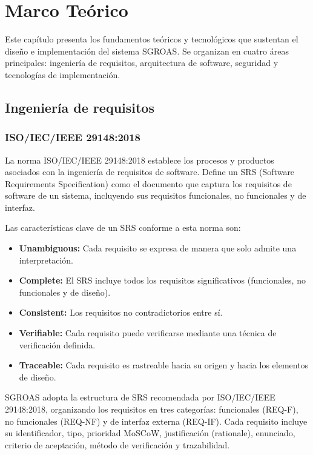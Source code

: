 \chapter{Marco Teórico}
\label{cap:marco-teorico}

Este capítulo presenta los fundamentos teóricos y tecnológicos que sustentan el diseño e implementación del sistema SGROAS. Se organizan en cuatro áreas principales: ingeniería de requisitos, arquitectura de software, seguridad y tecnologías de implementación.

\section{Ingeniería de requisitos}
\label{sec:req-theory}

\subsection{ISO/IEC/IEEE 29148:2018}
\label{sec:iso29148}

La norma ISO/IEC/IEEE 29148:2018 \cite{iso29148} establece los procesos y productos asociados con la ingeniería de requisitos de software. Define un SRS (Software Requirements Specification) como el documento que captura los requisitos de software de un sistema, incluyendo sus requisitos funcionales, no funcionales y de interfaz.

Las características clave de un SRS conforme a esta norma son:
\begin{itemize}
  \item \textbf{Unambiguous:} Cada requisito se expresa de manera que solo admite una interpretación.
  \item \textbf{Complete:} El SRS incluye todos los requisitos significativos (funcionales, no funcionales y de diseño).
  \item \textbf{Consistent:} Los requisitos no contradictorios entre sí.
  \item \textbf{Verifiable:} Cada requisito puede verificarse mediante una técnica de verificación definida.
  \item \textbf{Traceable:} Cada requisito es rastreable hacia su origen y hacia los elementos de diseño.
\end{itemize}

SGROAS adopta la estructura de SRS recomendada por ISO/IEC/IEEE 29148:2018, organizando los requisitos en tres categorías: funcionales (REQ-F), no funcionales (REQ-NF) y de interfaz externa (REQ-IF). Cada requisito incluye su identificador, tipo, prioridad MoSCoW, justificación (rationale), enunciado, criterio de aceptación, método de verificación y trazabilidad.

